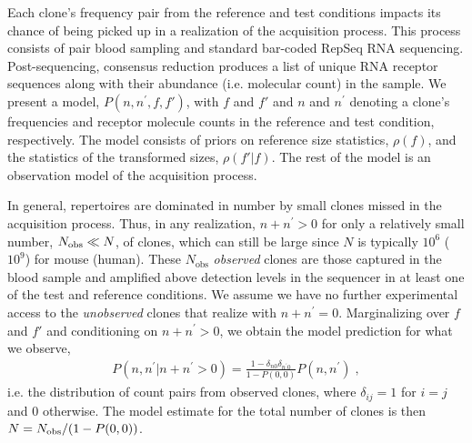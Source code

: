 \documentclass[letterpaper,english,prl,reprint,longbibliography]{revtex4-1} %
\begin{document}
Each clone's frequency pair from the reference and test conditions impacts its chance of being picked up in a realization of the acquisition process. This process consists of pair blood sampling and standard bar-coded RepSeq RNA sequencing. Post-sequencing, consensus reduction produces a list of unique RNA receptor sequences along with their abundance (i.e. molecular count) in the sample. 
We present a model, $P(n,n^{\prime},f,f')$, with $f$ and $f'$ and $n$ and $n^{\prime}$ denoting a clone's frequencies and receptor molecule counts in the reference and test condition, respectively. The model consists of priors on reference size statistics, $\rho(f)$, and the statistics of the transformed sizes, $\rho(f'|f)$. The rest of the model is an observation model of the acquisition process.

In general, repertoires are dominated in number by small clones missed in the acquisition process. Thus, in any realization, $n+n^{\prime}>0$ for only a relatively small number, $N_{\textrm{\textrm{obs}}}\ll N$, of clones, which can still be large since $N$ is typically $ 10^6$ ($10^9$) for mouse (human). These $N_{\textrm{obs}}$ \emph{observed} clones are those captured in the blood sample and amplified above detection levels in the sequencer in at least one of the test and reference conditions. We assume we have no further experimental access to the \emph{unobserved} clones that realize with $n+n^{\prime}=0$. Marginalizing over $f$ and $f'$ and conditioning on $n+n^{\prime}>0$, we obtain the model prediction for what we observe, 
\begin{align}
	P(n,n^{\prime}|n+n^{\prime}>0)=\frac{1-\delta_{n0}\delta_{n^{\prime}0}}{1-P(0,0)}P(n,n^{\prime})\;,
\end{align} 
i.e. the distribution of count pairs from observed clones, where $\delta_{ij}=1$ for $i=j$ and $0$ otherwise. The model estimate for the total number of clones is then $N=N_{\textrm{\textrm{obs}}}/(1-P(0,0))$. 
\end{document}
